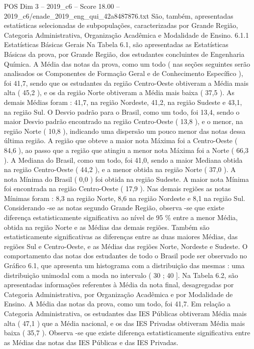 \begin{textsample}{POS Dim 3 – 2019\_c6 – Score 18.00 – 2019\_c6/enade\_2019\_eng\_qui\_42a8487876.txt}
São, também, apresentadas estatísticas selecionadas de subpopulações, caracterizadas por Grande Região, Categoria Administrativa, Organização Acadêmica e Modalidade de Ensino. 6.1.1 Estatísticas Básicas Gerais Na Tabela 6.1, são apresentadas as Estatísticas Básicas da prova, por Grande Região, dos estudantes concluintes de Engenharia Química.
A Média das notas da prova, como um todo ( nas seções seguintes serão analisados os Componentes de Formação Geral e de Conhecimento Específico ), foi 41,7, sendo que os estudantes da região Centro-Oeste obtiveram a Média mais alta ( 45,2 ), e os da região Norte obtiveram a Média mais baixa ( 37,5 ).
As demais Médias foram : 41,7, na região Nordeste, 41,2, na região Sudeste e 43,1, na região Sul.
O Desvio padrão para o Brasil, como um todo, foi 13,4, sendo o maior Desvio padrão encontrado na região Centro-Oeste ( 13,8 ), e o menor, na região Norte ( 10,8 ), indicando uma dispersão um pouco menor das notas dessa última região.
A região que obteve a maior nota Máxima foi a Centro-Oeste ( 84,6 ), ao passo que a região que atingiu a menor nota Máxima foi a Norte ( 66,3 ).
A Mediana do Brasil, como um todo, foi 41,0, sendo a maior Mediana obtida na região Centro-Oeste ( 44,2 ), e a menor obtida na região Norte ( 37,0 ).
A nota Mínima do Brasil ( 0,0 ) foi obtida na região Sudeste.
A maior nota Mínima foi encontrada na região Centro-Oeste ( 17,9 ).
Nas demais regiões as notas Mínimas foram : 8,3 na região Norte, 8,6 na região Nordeste e 8,1 na região Sul.
Considerando -se as notas segundo Grande Região, observa -se que existe diferença estatisticamente significativa ao nível de 95 \% entre a menor Média, obtida na região Norte e as Médias das demais regiões.
Também são estatisticamente significativas as diferenças entre as duas maiores Médias, das regiões Sul e Centro-Oeste, e as Médias das regiões Norte, Nordeste e Sudeste.
O comportamento das notas dos estudantes de todo o Brasil pode ser observado no Gráfico 6.1, que apresenta um histograma com a distribuição das mesmas : uma distribuição unimodal com a moda no intervalo ( 30 ; 40 ].
Na Tabela 6.2, são apresentadas informações referentes à Média da nota final, desagregadas por Categoria Administrativa, por Organização Acadêmica e por Modalidade de Ensino.
A Média das notas da prova, como um todo, foi 41,7.
Em relação a Categoria Administrativa, os estudantes das IES Públicas obtiveram Média mais alta ( 47,1 ) que a Média nacional, e os das IES Privadas obtiveram Média mais baixa ( 35,7 ).
Observa -se que existe diferença estatisticamente significativa entre as Médias das notas das IES Públicas e das IES Privadas.

\end{textsample}
